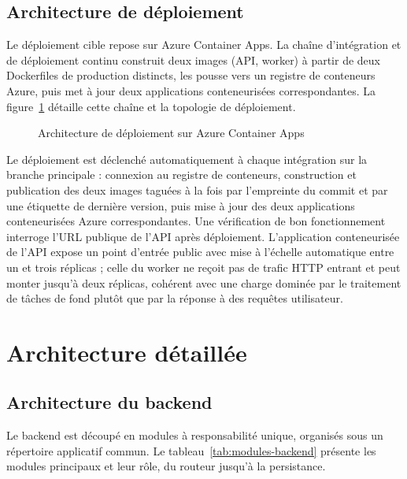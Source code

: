 \subsection{Architecture de déploiement}

Le déploiement cible repose sur Azure Container Apps. La chaîne d'intégration et de déploiement continu construit deux images (API, worker) à partir de deux Dockerfiles de production distincts, les pousse vers un registre de conteneurs Azure, puis met à jour deux applications conteneurisées correspondantes. La figure~\ref{fig:archi-deploiement} détaille cette chaîne et la topologie de déploiement.

\begin{figure}[H]
  \centering
  \caption{Architecture de déploiement sur Azure Container Apps}
  \label{fig:archi-deploiement}
\end{figure}

Le déploiement est déclenché automatiquement à chaque intégration sur la branche principale : connexion au registre de conteneurs, construction et publication des deux images taguées à la fois par l'empreinte du commit et par une étiquette de dernière version, puis mise à jour des deux applications conteneurisées Azure correspondantes. Une vérification de bon fonctionnement interroge l'URL publique de l'API après déploiement. L'application conteneurisée de l'API expose un point d'entrée public avec mise à l'échelle automatique entre un et trois réplicas ; celle du worker ne reçoit pas de trafic HTTP entrant et peut monter jusqu'à deux réplicas, cohérent avec une charge dominée par le traitement de tâches de fond plutôt que par la réponse à des requêtes utilisateur.

\section{Architecture détaillée}
\label{sec:archi-detaillee}

\subsection{Architecture du backend}

Le backend est découpé en modules à responsabilité unique, organisés sous un répertoire applicatif commun. Le tableau~\ref{tab:modules-backend} présente les modules principaux et leur rôle, du routeur jusqu'à la persistance.


